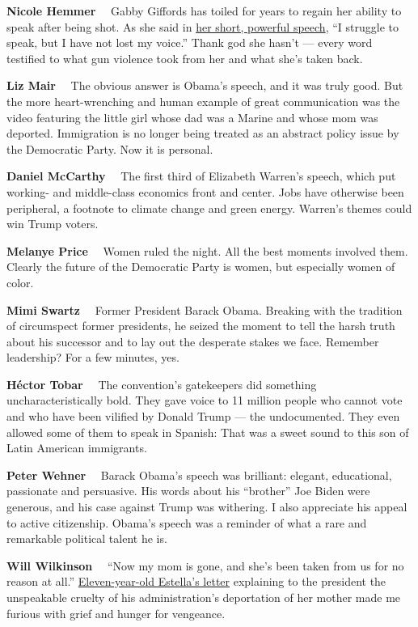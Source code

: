 \textbf{Nicole Hemmer}~~ Gabby Giffords has toiled for years to regain
her ability to speak after being shot. As she said in
\href{https://www.nytimes3xbfgragh.onion/video/us/elections/100000007297620/gabrielle-giffords-speaks-dnc.html}{her
short, powerful speech}, ``I struggle to speak, but I have not lost my
voice.'' Thank god she hasn't --- every word testified to what gun
violence took from her and what she's taken back.

\textbf{Liz Mair}~~ The obvious answer is Obama's speech, and it was
truly good. But the more heart-wrenching and human example of great
communication was the video featuring the little girl whose dad was a
Marine and whose mom was deported. Immigration is no longer being
treated as an abstract policy issue by the Democratic Party. Now it is
personal.

\textbf{Daniel McCarthy}~~ The first third of Elizabeth Warren's speech,
which put working- and middle-class economics front and center. Jobs
have otherwise been peripheral, a footnote to climate change and green
energy. Warren's themes could win Trump voters.

\textbf{Melanye Price}~~ Women ruled the night. All the best moments
involved them. Clearly the future of the Democratic Party is women, but
especially women of color.

\textbf{Mimi Swartz}~~ Former President Barack Obama. Breaking with the
tradition of circumspect former presidents, he seized the moment to tell
the harsh truth about his successor and to lay out the desperate stakes
we face. Remember leadership? For a few minutes, yes.

\textbf{Héctor Tobar}~~ The convention's gatekeepers did something
uncharacteristically bold. They gave voice to 11 million people who
cannot vote and who have been vilified by Donald Trump --- the
undocumented. They even allowed some of them to speak in Spanish: That
was a sweet sound to this son of Latin American immigrants.

\textbf{Peter Wehner}~~ Barack Obama's speech was brilliant: elegant,
educational, passionate and persuasive. His words about his ``brother''
Joe Biden were generous, and his case against Trump was withering. I
also appreciate his appeal to active citizenship. Obama's speech was a
reminder of what a rare and remarkable political talent he is.

\textbf{Will Wilkinson}~~ ``Now my mom is gone, and she's been taken
from us for no reason at all.''
\href{https://www.youtube.com/watch?v=1EiPUIv7C8g}{Eleven-year-old
Estella's letter} explaining to the president the unspeakable cruelty of
his administration's deportation of her mother made me furious with
grief and hunger for vengeance.

